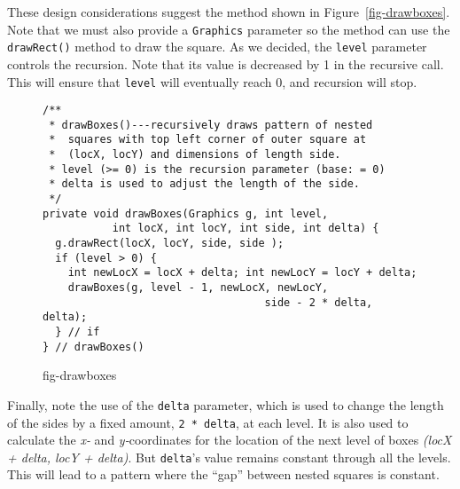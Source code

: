 These design considerations suggest the method shown in
Figure~\ref{fig-drawboxes}. Note that we must also provide a
{\tt Graphics} parameter so the method can use the {\tt drawRect()} method
to draw the square.  As we decided, the {\tt level} parameter controls
the recursion.  Note that its value is decreased by 1 in the recursive
call.  This will ensure that {\tt level} will eventually reach 0, and
recursion will stop.

\begin{figure}[hb!]
\jjjprogstart
\begin{jjjlisting}[26.5pc]
\begin{lstlisting}
/**
 * drawBoxes()---recursively draws pattern of nested 
 *  squares with top left corner of outer square at 
 *  (locX, locY) and dimensions of length side.
 * level (>= 0) is the recursion parameter (base: = 0)
 * delta is used to adjust the length of the side.
 */
private void drawBoxes(Graphics g, int level,
           int locX, int locY, int side, int delta) {
  g.drawRect(locX, locY, side, side );
  if (level > 0) {
    int newLocX = locX + delta; int newLocY = locY + delta;
    drawBoxes(g, level - 1, newLocX, newLocY,
                                   side - 2 * delta, delta);
  } // if
} // drawBoxes()
\end{lstlisting}
\end{jjjlisting}
{fig-drawboxes}
\end{figure}

Finally, note the use of the {\tt delta} parameter, which is used to
change the length of the sides by a fixed amount, {\tt 2 * delta}, at
each level.  It is also used to calculate the {\it x-} and {\it
y-}coordinates for the location of the next level of boxes {\it (locX
+ delta, locY + delta)}. But {\tt delta}'s value remains constant
through all the levels.  This will lead to a pattern where the ``gap''
between nested squares is constant.



